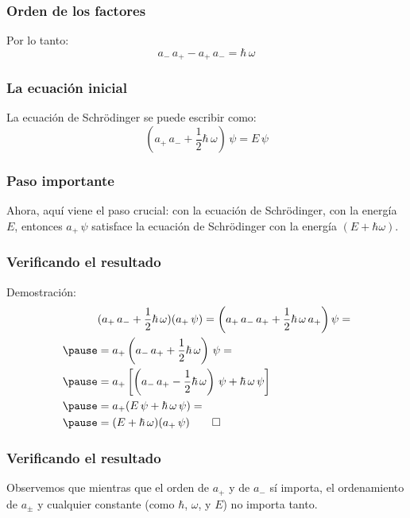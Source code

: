 \documentclass[12pt]{beamer}
\begin{document}
\begin{frame}
\frametitle{Orden de los factores}
Por lo tanto:
\pause
\begin{equation}
a_{-} \, a_{+} - a_{+} \, a_{-} = \hbar \, \omega
\label{eq:ecuacion_02_045}
\end{equation}
\end{frame}
\begin{frame}
\frametitle{La ecuación inicial}
La ecuación de Schrödinger se puede escribir como:
\pause
\begin{equation}
(a_{+} \, a_{-} + \dfrac{1}{2} \hbar \, \omega) \, \psi = E \, \psi
\label{eq:ecuacion_02_046}
\end{equation}
\end{frame}
\begin{frame}
\frametitle{Paso importante}
Ahora, aquí viene el paso crucial: \pause {} con la ecuación de Schrödinger, con la energía $E$, \pause entonces $a_{+} \, \psi$ satisface la ecuación de Schrödinger con la energía $(E + \hbar \omega)$.
\end{frame}
\begin{frame}
\frametitle{Verificando el resultado}
Demostración:
\pause
\begin{eqnarray*}
\begin{aligned}
&(a_{+} \, a_{-} + \dfrac{1}{2} \hbar \, \omega) (a_{+} \, \psi) = \left( a_{+} \, a_{-} \, a_{+} + \dfrac{1}{2} \hbar \, \omega \, a_{+} \right) \psi = \\ \pause
&= a_{+} \left( a_{-} \, a_{+} + \dfrac{1}{2} \hbar \, \omega \right) \, \psi = \\ \pause
&= a_{+} \left[ \left( a_{-} \, a_{+} - \dfrac{1}{2} \hbar \, \omega \right) \, \psi + \hbar \, \omega \, \psi \right] \\ \pause
&= a_{+} (E \, \psi + \hbar \, \omega \, \psi) = \\ \pause
&= (E + \hbar \, \omega) (a_{+} \, \psi) \qed
\end{aligned}
\end{eqnarray*}
\end{frame}
\begin{frame}
\frametitle{Verificando el resultado}
Observemos que mientras que el orden de $a_{+}$ y de $a_{-}$ sí importa, \pause el ordenamiento de $a_{\pm}$ y cualquier constante (como $\hbar$, $\omega$, y $E$) no importa tanto.
\end{frame}
\end{document}
